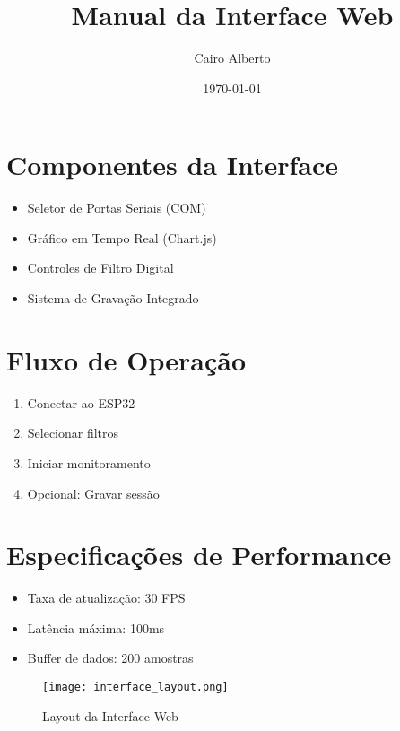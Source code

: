 \documentclass[12pt,a4paper]{article}
\title{Manual da Interface Web}
\author{Cairo Alberto}
\date{\today}
\begin{document}
\maketitle

\section{Componentes da Interface}
\begin{itemize}
\item Seletor de Portas Seriais (COM)
\item Gráfico em Tempo Real (Chart.js)
\item Controles de Filtro Digital
\item Sistema de Gravação Integrado
\end{itemize}

\section{Fluxo de Operação}
\begin{enumerate}
\item Conectar ao ESP32
\item Selecionar filtros
\item Iniciar monitoramento
\item Opcional: Gravar sessão
\end{enumerate}

\section{Especificações de Performance}
\begin{itemize}
\item Taxa de atualização: 30 FPS
\item Latência máxima: 100ms
\item Buffer de dados: 200 amostras
\end{itemize}

\begin{figure}[h]
\centering
\texttt{[image: interface\_layout.png]}
\caption{Layout da Interface Web}
\end{figure}
\end{document}
